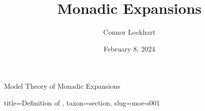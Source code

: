 \documentclass[a4paper]{article}
\title{Monadic Expansions}
\date{February 8, 2024}
\author{Connor Lockhart}
\begin{document}
\maketitle
\par{Model Theory of Monadic Expansions}
  
  
\begin{tree}{title={Definition of }, taxon={section}, slug={moe-s001}}

\end{tree}


\printbibliography
\end{document}
